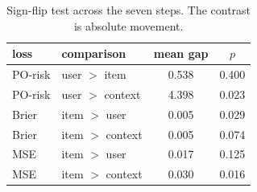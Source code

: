 \begin{table}[t]
\centering
\caption{MovieLens last day of the pathway. Rating MSE is the predictive companion of Brier.}
\label{tab:movielens-day}
\small
{}
\end{table}

\begin{table}[t]
\centering
\caption{Sign-flip test across the seven steps. The contrast is absolute movement.}
\label{tab:movielens-sign}
\begin{tabular}{llcc}
\toprule
loss & comparison & mean gap & $p$ \\
\midrule
PO-risk & user $>$ item & 0.538 & 0.400 \\
PO-risk & user $>$ context & 4.398 & 0.023 \\
Brier & item $>$ user & 0.005 & 0.029 \\
Brier & item $>$ context & 0.005 & 0.074 \\
MSE & item $>$ user & 0.017 & 0.125 \\
MSE & item $>$ context & 0.030 & 0.016 \\
\bottomrule
\end{tabular}
\end{table}

